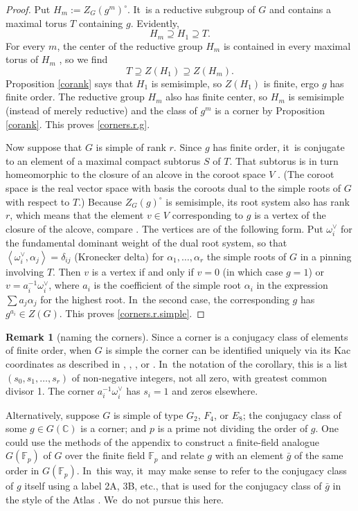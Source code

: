 \documentclass[JEP,XML,SOM,Unicode,NoFloatCountersInSection,published]{cedram}
\theoremstyle{definition}
\newtheorem{rmk}[equation]{Remark}
\let\ic\circ
\newcommand{\F}{\mathbb{F}}
\newcommand{\C}{\mathbb{C}}
\newcommand{\qform}[1]{{\left\langle{#1}\right\rangle}}
\newcommand{\ov}{\omega^\vee}
\begin{document}
\begin{proof}
Put $H_m := Z_G(g^m)^\ic$. It~is a reductive subgroup of $G$ and contains a maximal torus $T$ containing $g$. Evidently,
\[
H_m \supseteq H_1 \supseteq T.
\]
For every $m$, the center of the reductive group $H_m$ is contained in every maximal torus of $H_m$ \cite[Prop.\,21.7]{Milne}, so we find
\[
T \supseteq Z(H_1) \supseteq Z(H_m).
\]
Proposition \ref{corank} says that $H_1$ is semisimple, so $Z(H_1)$ is finite, ergo $g$ has finite order. The reductive group $H_m$ also has finite center, so $H_m$ is semisimple (instead of merely reductive) and the class of $g^m$ is a corner by Proposition \ref{corank}. This proves \eqref{corners.r.g}.

Now suppose that $G$ is simple of rank $r$. Since $g$ has finite order, it~is conjugate to an element of a maximal compact subtorus $S$ of $T$. That subtorus is in turn homeomorphic to the closure of an alcove in the coroot space $V$ \cite[\S{IX.5.2}, Cor.\,1]{Bou:g7}. (The coroot space is the real vector space with basis the coroots dual to the simple roots of $G$ with respect to $T$.) Because $Z_G(g)^\ic$ is semisimple, its root system also has rank $r$, which means that the element $v \in V$ corresponding to $g$ is a vertex of the closure of the alcove, compare \cite[p.\,11]{Reeder:tor}. The vertices are of the following form. Put $\ov_i$ for the fundamental dominant weight of the dual root system, so that $\qform{ \ov_i, \alpha_j} = \delta_{ij}$ (Kronecker delta) for $\alpha_1, \ldots, \alpha_r$ the simple roots of $G$ in a pinning involving $T$. Then $v$ is a vertex if and only if $v = 0$ (in which case $g = 1$) or $v = a_i^{-1} \ov_i$, where $a_i$ is the coefficient of the simple root $\alpha_i$ in the expression $\sum a_j \alpha_j$ for the highest root. In~the second case, the corresponding $g$ has $g^{a_i} \in Z(G)$. This proves \eqref{corners.r.simple}.
\end{proof}

\begin{rmk}[naming the corners] \label{naming}
Since a corner is a conjugacy class of elements of finite order, when $G$ is simple the corner can be identified uniquely via its Kac coordinates as described in \cite{Kac:aut}, \cite{Se:Kac}, \cite[\S2.2]{Reeder:tor}, or \cite[\S6]{Lehalleur}. In~the notation of the corollary, this is a list $(s_0, s_1, \ldots, s_r)$ of non-negative integers, not all zero, with greatest common divisor 1. The corner $a_i^{-1} \ov_i$ has $s_i = 1$ and zeros elsewhere.

Alternatively, suppose $G$ is simple of type $G_2$, $F_4$, or $E_8$; the conjugacy class of some $g \in G(\C)$ is a corner; and $p$ is a prime not dividing the order of $g$. One could use the methods of the appendix to construct a finite-field analogue $G(\F_p)$ of $G$ over the finite field $\F_p$ and relate $g$ with an element $\bar{g}$ of the same order in $G(\F_p)$. In~this way, it~may make sense to refer to the conjugacy class of $g$ itself using a label 2A, 3B, etc., that is used for the conjugacy class of $\bar{g}$ in the style of the Atlas \cite{atlas}. We~do not pursue this here.
\end{rmk}
\end{document}
